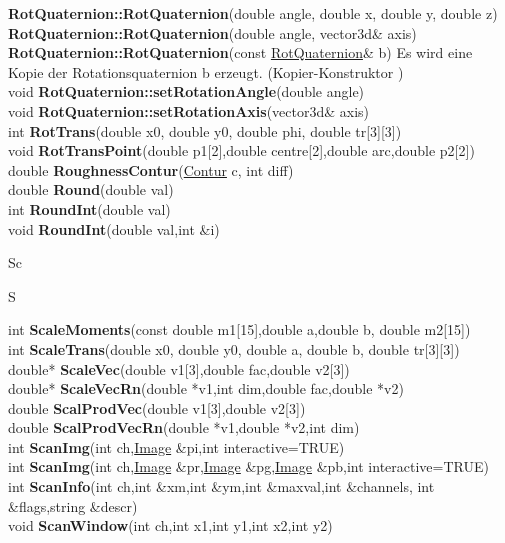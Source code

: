 \documentclass[10pt,titlepage]{article}
\def\functionlistentry#1#2#3#4#5#6{\noindent #1 {\bf #2}(#3) \dotfill #6\\}
\def\letterref#1{}
\def\letterlabel#1{\vspace{0.5cm}\centerline{\Large #1}}
\def\letterlabelend#1{}
\begin{document}
{{\functionlistentry{}{RotQuaternion::RotQuaternion}{double angle, double x, double y, double z}{1479}{quaternions}{}
\functionlistentry{}{RotQuaternion::RotQuaternion}{double angle, vector3d\& axis}{1480}{quaternions}{}
\functionlistentry{}{RotQuaternion::RotQuaternion}{const \hyperlink{RotQuaternion}{RotQuaternion}\& b) { Es wird eine Kopie der Rotationsquaternion b erzeugt. (Kopier-Konstruktor} }{1481}{quaternions}{}
\functionlistentry{void}{RotQuaternion::setRotationAngle}{double angle}{1489}{quaternions}{}
\functionlistentry{void}{RotQuaternion::setRotationAxis}{vector3d\& axis}{1490}{quaternions}{}
\functionlistentry{int}{RotTrans}{double x0, double y0, double phi, double tr[3][3]}{1586}{obsolet}{}
\functionlistentry{void}{RotTransPoint}{double p1[2],double centre[2],double arc,double p2[2]}{1372}{numeric}{}
\functionlistentry{double}{RoughnessContur}{\hyperlink{Contur}{Contur} c, int diff}{431}{conturs}{}
\functionlistentry{double}{Round}{double val}{1359}{numeric}{}
\functionlistentry{int}{RoundInt}{double val}{1360}{numeric}{}
\functionlistentry{void}{RoundInt}{double val,int \&i}{1361}{numeric}{}

\letterlabel{Sc}
\letterlabel{S}
\letterref{A}
\letterref{B}
\letterref{C}
\letterref{D}
\letterref{E}
\letterref{F}
\letterref{G}
\letterref{H}
\letterref{I}
\letterref{K}
\letterref{L}
\letterref{M}
\letterref{N}
\letterref{O}
\letterref{P}
\letterref{Q}
\letterref{R}
\letterref{S}
\letterref{T}
\letterref{U}
\letterref{V}
\letterref{W}
\letterref{X}
\letterref{Y}
\letterref{Z}

\letterref{Sc}
\letterref{Se}
\letterref{Sh}
\letterref{Si}
\letterref{Sk}
\letterref{Sm}
\letterref{So}
\letterref{Sp}
\letterref{Sq}
\letterref{St}
\letterref{Su}
\letterlabelend{Sc}
\functionlistentry{int}{ScaleMoments}{const double m1[15],double a,double b, double m2[15]}{1611}{obsolet}{}
\functionlistentry{int}{ScaleTrans}{double x0, double y0, double a, double b, double tr[3][3]}{1587}{obsolet}{}
\functionlistentry{double*}{ScaleVec}{double v1[3],double fac,double v2[3]}{1561}{obsolet}{}
\functionlistentry{double*}{ScaleVecRn}{double *v1,int dim,double fac,double *v2}{1571}{obsolet}{}
\functionlistentry{double}{ScalProdVec}{double v1[3],double v2[3]}{1562}{obsolet}{}
\functionlistentry{double}{ScalProdVecRn}{double *v1,double *v2,int dim}{1572}{obsolet}{}
\functionlistentry{int}{ScanImg}{int ch,\hyperlink{Image}{Image} \&pi,int interactive=TRUE}{148}{imageio}{}
\functionlistentry{int}{ScanImg}{int ch,\hyperlink{Image}{Image} \&pr,\hyperlink{Image}{Image} \&pg,\hyperlink{Image}{Image} \&pb,int interactive=TRUE}{149}{imageio}{}
\functionlistentry{int}{ScanInfo}{int ch,int \&xm,int \&ym,int \&maxval,int \&channels, int \&flags,string \&descr}{150}{imageio}{}
\functionlistentry{void}{ScanWindow}{int ch,int x1,int y1,int x2,int y2}{147}{imageio}{}

}}
\end{document}
